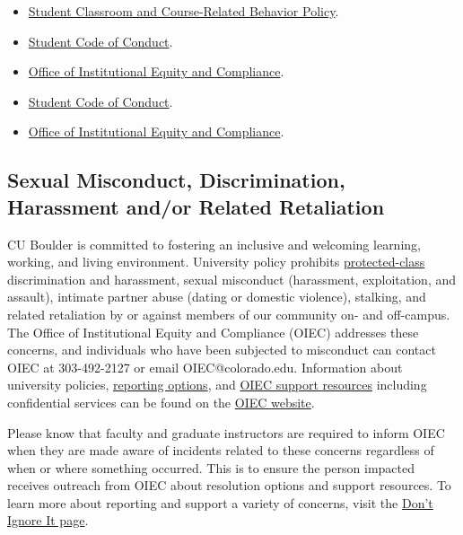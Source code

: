 \begin{itemize}
    \item \href{https://www.colorado.edu/compliance/policies/student-classroom-course-related-behavior}{Student Classroom and Course-Related Behavior Policy}.
    \item \href{https://www.colorado.edu/sccr/students/honor-code-and-student-code-conduct}{Student Code of Conduct}.
    \item \href{https://www.colorado.edu/oiec/}{Office of Institutional Equity and Compliance}.
    \item \href{https://www.colorado.edu/sccr/students/honor-code-and-student-code-conduct}{Student Code of Conduct}.
    \item \href{https://www.colorado.edu/oiec/}{Office of Institutional Equity and Compliance}.
\end{itemize}

\subsection*{Sexual Misconduct, Discrimination, Harassment and/or Related Retaliation}

CU Boulder is committed to fostering an inclusive and welcoming learning, working, and living environment. University policy prohibits \href{https://www.colorado.edu/oiec/policies/protected-class-nondiscrimination-policy/protected-class-definitions}{protected-class} discrimination and harassment, sexual misconduct (harassment, exploitation, and assault), intimate partner abuse (dating or domestic violence), stalking, and related retaliation by or against members of our community on- and off-campus. The Office of Institutional Equity and Compliance (OIEC) addresses these concerns, and individuals who have been subjected to misconduct can contact OIEC at 303-492-2127 or email OIEC@colorado.edu. Information about university policies, \href{https://www.colorado.edu/oiec/reporting-resolutions/making-report}{reporting options}, and \href{https://www.colorado.edu/oiec/support-resources}{OIEC support resources} including confidential services can be found on the \href{https://www.colorado.edu/oiec/}{OIEC website}.

Please know that faculty and graduate instructors are required to inform OIEC when they are made aware of incidents related to these concerns regardless of when or where something occurred. This is to ensure the person impacted receives outreach from OIEC about resolution options and support resources. To learn more about reporting and support a variety of concerns, visit the \href{https://www.colorado.edu/dontignoreit/}{Don't Ignore It page}.

